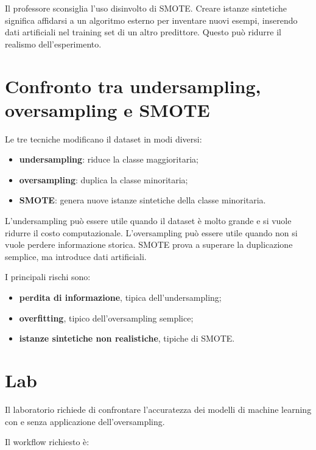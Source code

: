 \begin{notaprof}
Il professore sconsiglia l'uso disinvolto di SMOTE. Creare istanze sintetiche significa affidarsi a un algoritmo esterno per inventare nuovi esempi, inserendo dati artificiali nel training set di un altro predittore. Questo può ridurre il realismo dell'esperimento.
\end{notaprof}

\section{Confronto tra undersampling, oversampling e SMOTE}

Le tre tecniche modificano il dataset in modi diversi:

\begin{itemize}
    \item \textbf{undersampling}: riduce la classe maggioritaria;
    \item \textbf{oversampling}: duplica la classe minoritaria;
    \item \textbf{SMOTE}: genera nuove istanze sintetiche della classe minoritaria.
\end{itemize}

L'undersampling può essere utile quando il dataset è molto grande e si vuole ridurre il costo computazionale. L'oversampling può essere utile quando non si vuole perdere informazione storica. SMOTE prova a superare la duplicazione semplice, ma introduce dati artificiali.

I principali rischi sono:

\begin{itemize}
    \item \textbf{perdita di informazione}, tipica dell'undersampling;
    \item \textbf{overfitting}, tipico dell'oversampling semplice;
    \item \textbf{istanze sintetiche non realistiche}, tipiche di SMOTE.
\end{itemize}

\section{Lab}

Il laboratorio richiede di confrontare l'accuratezza dei modelli di machine learning con e senza applicazione dell'oversampling.

Il workflow richiesto è:

